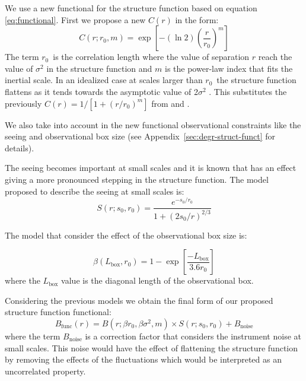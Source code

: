 \documentclass[fleqn,usenatbib, useAMS, a4paper]{mnras}
\begin{document}
We use a new functional for the structure function based on equation \ref{eq:functional}. 
First we propose a new \(C(r)\) in the form:
%
\begin{equation}\label{eq:new-correlation-form}
  C(r; r_0, m) = \exp \left[ -(\ln 2) \left( \frac{r}{r_0} \right)^m \right]
\end{equation}
%
The term \(r_{0}\)\ is the correlation length where the value of separation \(r\) reach the value of \(\sigma^2\) in the structure function and $m$ is the power-law index that fits the inertial scale.
In an idealized case at scales larger than \(r_{0}\)\ the structure function flattens as it tends towards the asymptotic value of 2\(\sigma^2\) \citep{arthur2016turbulence}.
This substitutes the previously \(C(r) = 1/[1+(r/r_{0})^{m}]\) from \citet{1966igd..book.....K} and
\citet{1984ApJ...277..556S}.

We also take into account in the new functional observational constraints like the seeing and observational box size (see Appendix~\ref{sec:degr-struct-funct} for details). 

The seeing becomes important at small scales and it is known that has an effect giving a more pronounced stepping in the structure function.
The model proposed to describe the seeing at small scales is:
%
\begin{equation}\label{eq:ffs}
  S(r; s_0, r_0) = \frac{
    e^{-s_0 / r_0}
  }{
    1+(2s_0 / r)^{2 / 3}
  }
\end{equation}

The model that consider the effect of the observational box size is:

\begin{equation}\label{eq:ffb}
  \beta(L_{\text{box}},r_0) = 1 - \exp \left[ \frac{-L_{\text{box}}} {3.6 r_0} \right] 
\end{equation}
%
where the \(L_{\text{box}}\) value is the diagonal length of the observational box.

Considering the previous models we obtain the final form of our proposed structure function functional:
%
\begin{equation}\label{eq:sf-functional}
B_{\text{func}}(r) = B(r; \beta r_0, \beta \sigma^2,m) \times S(r; s_0, r_0) + B_{\text{noise}}
\end{equation}
%
where the term \( B_{\text{noise}}\) is a correction factor that considers the instrument noise at small scales.
This noise would have the effect of flattening the structure function by removing the effects of the fluctuations which would be interpreted as an uncorrelated property. 
\end{document}
